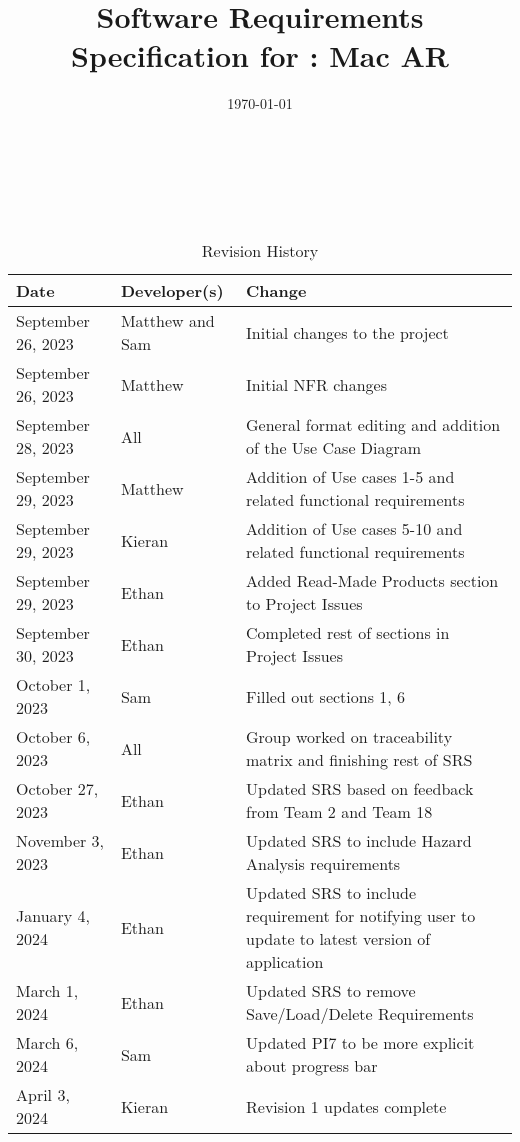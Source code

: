 \documentclass[12pt]{article}
\begin{document}
\title{Software Requirements Specification for \progname: Mac AR}
\author{\authname}
\date{\today}

\maketitle

~\newpage


\tableofcontents

~\newpage

\begin{table}[hp]
	\caption{Revision History} \label{TblRevisionHistory}
	\begin{tabularx}{\textwidth}{llX}
		\toprule
		\textbf{Date}      & \textbf{Developer(s)} & \textbf{Change}                                                                    \\
		\midrule
		September 26, 2023 & Matthew and Sam               & Initial changes to the project                                                             \\
            September 26, 2023 & Matthew & Initial NFR changes \\
            September 28, 2023 & All & General format editing and addition of the Use Case Diagram\\
            September 29, 2023 & Matthew & Addition of Use cases 1-5 and related functional requirements\\
            September 29, 2023 & Kieran & Addition of Use cases 5-10 and related functional requirements\\
            September 29, 2023 & Ethan & Added Read-Made Products section to Project Issues\\
            September 30, 2023 & Ethan & Completed rest of sections in Project Issues\\
            October 1, 2023 & Sam & Filled out sections 1, 6\\
            October 6, 2023 & All & Group worked on traceability matrix and finishing rest of SRS\\  
            October 27, 2023 & Ethan & Updated SRS based on feedback from Team 2 and Team 18\\
            November 3, 2023 & Ethan & Updated SRS to include Hazard Analysis requirements\\
            January 4, 2024 & Ethan & Updated SRS to include requirement for notifying user to update to latest version of application\\
            March 1, 2024 & Ethan & Updated SRS to remove Save/Load/Delete Requirements\\
            March 6, 2024 & Sam & Updated PI7 to be more explicit about progress bar\\
            April 3, 2024 & Kieran & Revision 1 updates complete\\
		\bottomrule
	\end{tabularx}
\end{table}
\end{document}
